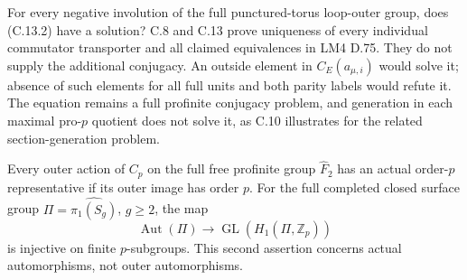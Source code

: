 For every negative involution of the full punctured-torus
loop-outer group, does (C.13.2) have a solution?
C.8 and C.13 prove uniqueness of every individual
commutator transporter and all claimed equivalences
in LM4 D.75.  They do not supply the additional
conjugacy.  An outside element in $C_E(a_{\mu,i})$
would solve it; absence of such elements for all
full units and both parity labels would refute it.
The equation remains a full profinite conjugacy
problem, and generation in each maximal pro-$p$
quotient does not solve it, as C.10 illustrates
for the related section-generation problem.

Every outer action of $C_p$ on the full free profinite group
$\widehat F_2$ has an actual order-$p$ representative if its
outer image has order $p$.  For the full completed closed
surface group $\Pi=\widehat{\pi_1(S_g)}$, $g\geq2$, the map
\[
 \operatorname{Aut}(\Pi)\longrightarrow
       \operatorname{GL}(H_1(\Pi,\mathbb Z_p))
                                                               \tag{C.15.1}
\]
is injective on finite $p$-subgroups.  This second assertion
concerns actual automorphisms, not outer automorphisms.

